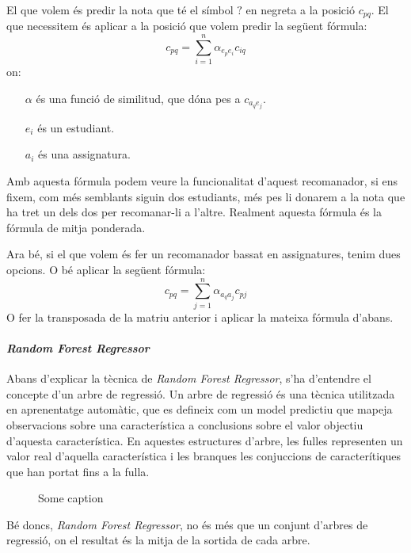 \documentclass[11pt,a4paper,catalan]{article}
\begin{document}
El que volem és predir la nota que té el símbol $?$ en negreta a la posició $c_{pq}$. El que necessitem és aplicar a la posició que volem predir la següent fórmula:
$$
	c_{pq} = \sum_{i=1}^n{\alpha_{e_pe_i}c_{iq}}
$$
on:
\begin{itemize}[leftmargin=.5in]
	\item [$\alpha$] és una funció de similitud, que dóna pes a $c_{a_qe_j}$.
	\item [$e_i$] és un estudiant.
	\item [$a_i$] és una assignatura.
\end{itemize}

Amb aquesta fórmula podem veure la funcionalitat d'aquest recomanador, si ens fixem, com més semblants siguin dos estudiants, més pes li donarem a la nota que ha tret un dels dos per recomanar-li a l'altre. Realment aquesta fórmula és la fórmula de mitja ponderada.

\newpage

Ara bé, si el que volem és fer un recomanador bassat en assignatures, tenim dues opcions. O bé aplicar la següent fórmula:
$$
	c_{pq} = \sum_{j=1}^n{\alpha_{a_qa_j}c_{pj}}
$$
O fer la transposada de la matriu anterior i aplicar la mateixa fórmula d'abans.

\paragraph{\textit{Random Forest Regressor}}
Abans d'explicar la tècnica de \textit{Random Forest Regressor}, s'ha d'entendre el concepte d'un arbre de regressió. Un arbre de regressió és una tècnica utilitzada en aprenentatge automàtic, que es defineix com un model predictiu que mapeja observacions sobre una característica a conclusions sobre el valor objectiu d'aquesta característica. En aquestes estructures d'arbre, les fulles representen un valor real d'aquella característica i les branques les conjuccions de caracterítiques que han portat fins a la fulla.


\begin{figure}[h]
\centering
{}
\caption{Some caption}
\end{figure}

Bé doncs, \textit{Random Forest Regressor}, no és més que un conjunt d'arbres de regressió, on el resultat és la mitja de la sortida de cada arbre.
\end{document}
